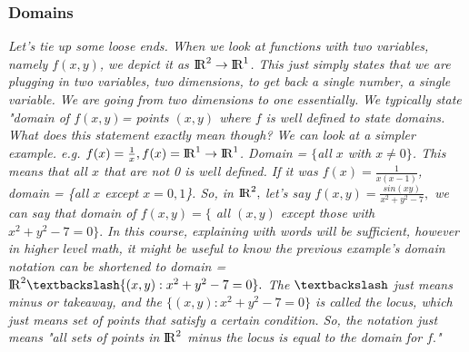 \documentclass[addpoints]{exam}
\begin{document}
\subsubsection{
Domains
}
\textit{
Let's tie up some loose ends. When we look at functions with two variables, namely $f(x,y)$, we depict it as ${\rm I\!R}^2\rightarrow{\rm I\!R}^1$. This just simply states that we are plugging in two variables, two dimensions, to get back a single number, a single variable. We are going from two dimensions to one essentially.
}
\textit{
We typically state "domain of $f(x,y)$= points $(x,y)$ where $f$ is well defined to state domains. What does this statement exactly mean though? We can look at a simpler example.
e.g. $f(x)=\frac{1}{x}, f(x)={\rm I\!R}^1\rightarrow{\rm I\!R}^1$. Domain = $\{$all $x$ with $x\neq0$$\}$. This means that all $x$ that are not 0 is well defined. If it was $f(x)=\frac{1}{x(x-1)}$, domain = \{all $x$ except $x=0,1$\}.
So, in ${\rm I\!R}^2,$ let's say $f(x,y)=\frac{sin(xy)}{x^2+y^2-7},$ we can say that domain of $f(x,y)=\{$ all $(x,y)$ except those with $x^2+y^2-7=0\}.$
In this course, explaining with words will be sufficient, however in higher level math, it might be useful to know the previous example's domain notation can be shortened to domain = ${\rm I\!R}^2\textbackslash\{(x,y):x^2+y^2-7=0\}.$ The $\textbackslash$ just means minus or takeaway, and the $\{(x,y):x^2+y^2-7=0\}$ is called the locus, which just means set of points that satisfy a certain condition. So, the notation just means "all sets of points in ${\rm I\!R}^2$ minus the locus is equal to the domain for $f.$"
}
\end{document}
